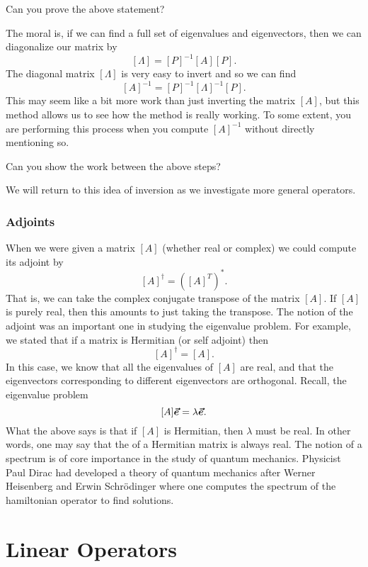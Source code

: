 \begin{exercise}
	Can you prove the above statement?
\end{exercise}

The moral is, if we can find a full set of eigenvalues and eigenvectors, then we can diagonalize our matrix by
\[
[\Lambda]=[P]^{-1}[A][P].
\]
The diagonal matrix $[\Lambda]$ is very easy to invert and so we can find
\[
[A]^{-1} = [P]^{-1}[\Lambda]^{-1}[P].
\]
This may seem like a bit more work than just inverting the matrix $[A]$, but this method allows us to see how the method is really working.  To some extent, you are performing this process when you compute $[A]^{-1}$ without directly mentioning so.

\begin{exercise}
	Can you show the work between the above steps?
\end{exercise}

We will return to this idea of inversion as we investigate more general operators.  


\subsubsection{Adjoints}

When we were given a matrix $[A]$ (whether real or complex) we could compute its adjoint by 
\[
[A]^\dagger=\left([A]^T\right)^*.
\]
That is, we can take the complex conjugate transpose of the matrix $[A]$. If $[A]$ is purely real, then this amounts to just taking the transpose. The notion of the adjoint was an important one in studying the eigenvalue problem.  For example, we stated that if a matrix is Hermitian (or self adjoint) then
\[
[A]^\dagger = [A].
\]
In this case, we know that all the eigenvalues of $[A]$ are real, and that the eigenvectors corresponding to different eigenvectors are orthogonal.  Recall, the eigenvalue problem
\[
[A]\boldsymbol{\vec{e}} = \lambda \boldsymbol{\vec{e}}.
\]
What the above says is that if $[A]$ is Hermitian, then $\lambda$ must be real.  In other words, one may say that the  of a Hermitian matrix is always real.  The notion of a spectrum is of core importance in the study of quantum mechanics. Physicist Paul Dirac had developed a theory of quantum mechanics after Werner Heisenberg and Erwin Schr\"odinger where one computes the spectrum of the hamiltonian operator to find solutions.

\section{Linear Operators}

